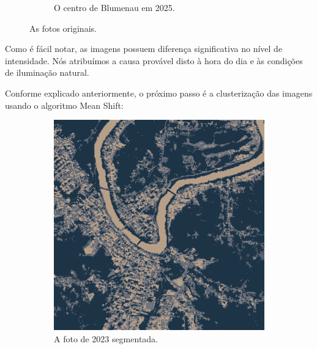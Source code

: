 \documentclass{article}
\begin{document}
\begin{figure}[H]
\begin{subfigure}[b]{0.48\textwidth}
        \caption{O centro de Blumenau em 2025.}
        \label{2025}
    \end{subfigure}
    \caption{As fotos originais.}
    \label{original}
\end{figure}

Como é fácil notar, as imagens possuem diferença significativa no nível de intensidade. Nós atribuímos a causa provável disto à hora do dia e às condições de iluminação natural.

Conforme explicado anteriormente, o próximo passo é a clusterização das imagens usando o algoritmo Mean Shift:

\begin{figure}[H]
    \centering
    \begin{subfigure}[b]{0.48\textwidth}
        \includegraphics[width=\textwidth]{../Imagens/012023_mean_shift.png}
        \caption{A foto de 2023 segmentada.}
        \label{2023}
    \end{subfigure}
    \hfill %
    \begin{subfigure}[b]{0.48\textwidth}

\end{subfigure}
\end{figure}
\end{document}

